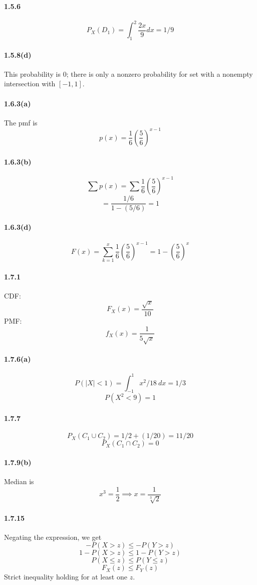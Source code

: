 \documentclass[10pt,letter]{article}
\begin{document}
\paragraph{1.5.6}
\[ P_X(D_1) = \int_{1}^2 \frac{2x}{9} dx = 1/9 \]
\paragraph{1.5.8(d)} This probability is 0; there is only a nonzero probability for set with a nonempty intersection with $[-1, 1]$.
\paragraph{1.6.3(a)}
The pmf is
\[ p(x) = \frac{1}{6}\left(\frac{5}{6} \right)^{x-1} \]
\paragraph{1.6.3(b)}
\[ \sum p(x) = \sum \frac{1}{6}\left(\frac{5}{6} \right)^{x-1} \]
\[ = \frac{1/6}{1-(5/6)} = 1 \]
\paragraph{1.6.3(d)}
\[ F(x) = \sum_{k=1}^x \frac{1}{6}\left(\frac{5}{6} \right)^{x-1} = 1-\left(\frac{5}{6}\right)^x\]
\paragraph{1.7.1}
CDF:
\[ F_X(x) = \frac{\sqrt{x}}{10} \]
PMF:
\[ f_X(x) = \frac{1}{5\sqrt{x}} \]
\paragraph{1.7.6(a)}
\[ P(|X|<1) = \int_{-1}^1 x^2/18 \ dx = 1/3 \]
\[ P(X^2<9) = 1 \]
\paragraph{1.7.7}
\[ P_X(C_1 \cup C_2) = 1/2 + (1/20) = 11/20 \]
\[ P_X(C_1 \cap C_2) = 0 \]
\paragraph{1.7.9(b)}
Median is
\[ x^3 = \frac{1}{2} \implies x = \frac{1}{\sqrt[3]{2}} \]
\paragraph{1.7.15}
Negating the expression, we get
\[ - P(X > z) \le - P(Y > z) \]
\[ 1 - P(X > z) \le 1 - P(Y > z) \]
\[ P(X \le z) \le P(Y \le z) \]
\[ F_X(z) \le F_Y(z) \]
Strict inequality holding for at least one $z$.
\end{document}
